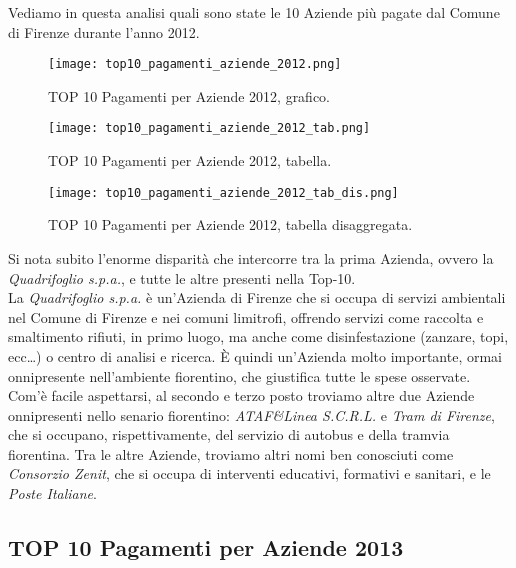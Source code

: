			Vediamo in questa analisi quali sono state le 10 Aziende più pagate dal Comune di Firenze durante l'anno 2012.\\
			
			\begin{figure}[h!]
				\centering
					\texttt{[image: top10\_pagamenti\_aziende\_2012.png]}
				\caption{TOP 10 Pagamenti per Aziende 2012, grafico.}
				\label{fig:top10_pagamenti_aziende_2012}
			\end{figure}
			
			\begin{figure}[h!]
				\centering
					\texttt{[image: top10\_pagamenti\_aziende\_2012\_tab.png]}
				\caption{TOP 10 Pagamenti per Aziende 2012, tabella.}
				\label{fig:top10_pagamenti_aziende_2012_tab}
			\end{figure}
			
			\begin{figure}[h!]
				\centering
					\texttt{[image: top10\_pagamenti\_aziende\_2012\_tab\_dis.png]}
				\caption{TOP 10 Pagamenti per Aziende 2012, tabella disaggregata.}
				\label{fig:top10_pagamenti_aziende_2012_tab_dis}
			\end{figure}
			
			Si nota subito l'enorme disparità che intercorre tra la prima Azienda, ovvero la \textit{Quadrifoglio s.p.a.}, e tutte le altre presenti nella Top-10.\\
			La \textit{Quadrifoglio s.p.a.} è un'Azienda di Firenze che si occupa di servizi ambientali nel Comune di Firenze e nei comuni limitrofi, offrendo servizi come raccolta e smaltimento rifiuti, in primo luogo, ma anche come disinfestazione (zanzare, topi, ecc\dots) o centro di analisi e ricerca. È quindi un'Azienda molto importante, ormai onnipresente nell'ambiente fiorentino, che giustifica tutte le spese osservate.\\
			Com'è facile aspettarsi, al secondo e terzo posto troviamo altre due Aziende onnipresenti nello senario fiorentino: \textit{ATAF\&Linea S.C.R.L.} e \textit{Tram di Firenze}, che si occupano, rispettivamente, del servizio di autobus e della tramvia fiorentina.
			Tra le altre Aziende, troviamo altri nomi ben conosciuti come \textit{Consorzio Zenit}, che si occupa di interventi educativi, formativi e sanitari, e le \textit{Poste Italiane}.
			
			\FloatBarrier
		
		\subsection{TOP 10 Pagamenti per Aziende 2013} \label{subsec:pagamenti_aziende_2013}
		
